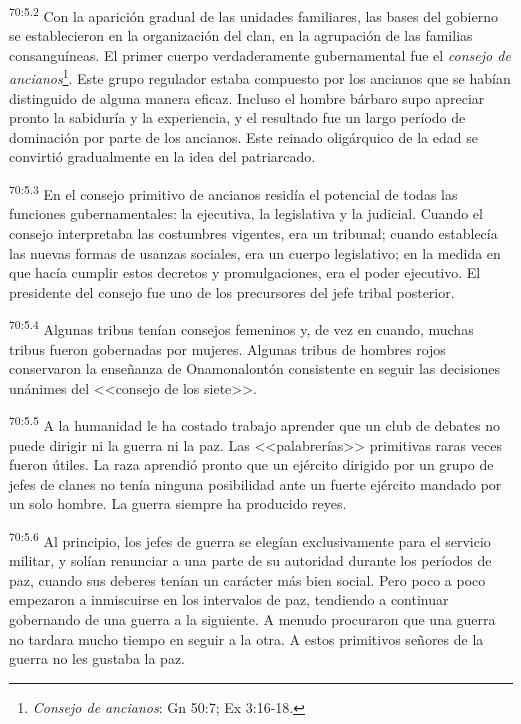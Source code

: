\par
\textsuperscript{70:5.2} Con la aparición gradual de las unidades familiares, las bases del gobierno se establecieron en la organización del clan, en la agrupación de las familias consanguíneas. El primer cuerpo verdaderamente gubernamental fue el \textit{consejo de ancianos}\footnote{\textit{Consejo de ancianos}: Gn 50:7; Ex 3:16-18.}. Este grupo regulador estaba compuesto por los ancianos que se habían distinguido de alguna manera eficaz. Incluso el hombre bárbaro supo apreciar pronto la sabiduría y la experiencia, y el resultado fue un largo período de dominación por parte de los ancianos. Este reinado oligárquico de la edad se convirtió gradualmente en la idea del patriarcado.

\par
\textsuperscript{70:5.3} En el consejo primitivo de ancianos residía el potencial de todas las funciones gubernamentales: la ejecutiva, la legislativa y la judicial. Cuando el consejo interpretaba las costumbres vigentes, era un tribunal; cuando establecía las nuevas formas de usanzas sociales, era un cuerpo legislativo; en la medida en que hacía cumplir estos decretos y promulgaciones, era el poder ejecutivo. El presidente del consejo fue uno de los precursores del jefe tribal posterior.

\par
\textsuperscript{70:5.4} Algunas tribus tenían consejos femeninos y, de vez en cuando, muchas tribus fueron gobernadas por mujeres. Algunas tribus de hombres rojos conservaron la enseñanza de Onamonalontón consistente en seguir las decisiones unánimes del <<consejo de los siete>>.

\par
\textsuperscript{70:5.5} A la humanidad le ha costado trabajo aprender que un club de debates no puede dirigir ni la guerra ni la paz. Las <<palabrerías>> primitivas raras veces fueron útiles. La raza aprendió pronto que un ejército dirigido por un grupo de jefes de clanes no tenía ninguna posibilidad ante un fuerte ejército mandado por un solo hombre. La guerra siempre ha producido reyes.

\par
\textsuperscript{70:5.6} Al principio, los jefes de guerra se elegían exclusivamente para el servicio militar, y solían renunciar a una parte de su autoridad durante los períodos de paz, cuando sus deberes tenían un carácter más bien social. Pero poco a poco empezaron a inmiscuirse en los intervalos de paz, tendiendo a continuar gobernando de una guerra a la siguiente. A menudo procuraron que una guerra no tardara mucho tiempo en seguir a la otra. A estos primitivos señores de la guerra no les gustaba la paz.

